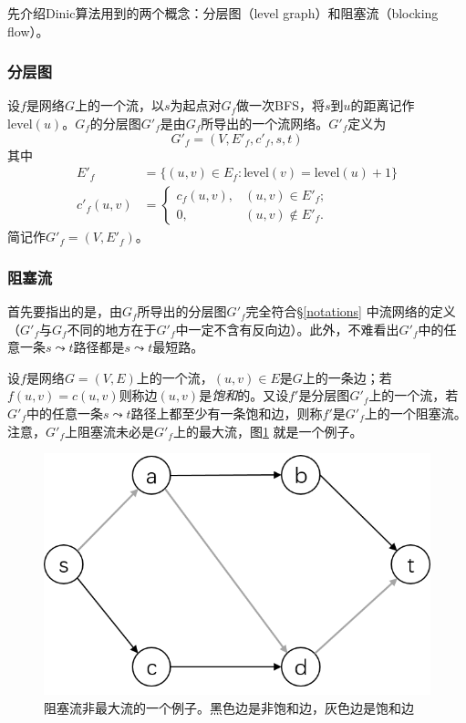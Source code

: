 \documentclass[a4paper]{ctexbook}
\begin{document}
  先介绍Dinic算法用到的两个概念：分层图（level graph）和阻塞流（blocking flow）。
  \subsubsection*{分层图}
  设$f$是网络$G$上的一个流，以$s$为起点对$G_f$做一次BFS，将$s$到$u$的距离记作$\mathrm{level}(u)$。$G_f$的分层图$G'_f$是由$G_f$所导出的一个流网络。$G'_f$定义为
  \[
  G'_f =(V, E'_f, c'_f, s, t)
  \]
  其中
  \begin{align*}
      E'_f &= \{(u,v)\in E_f\colon \mathrm{level}(v) = \mathrm{level}(u)+1\} \\
      c'_f(u,v) &=\begin{cases}
      c_f(u,v), & (u,v)\in E'_f;\\
      0, & (u,v)\notin E'_f.\end{cases}
  \end{align*}
  简记作$G'_f =(V, E'_f)$。
  \subsubsection{阻塞流}
  首先要指出的是，由$G_f$所导出的分层图$G'_f$完全符合\S\ref{notations} 中流网络的定义（$G'_f$与$G_f$不同的地方在于$G'_f$中一定不含有反向边）。此外，不难看出$G'_f$中的任意一条$s\leadsto t$路径都是$s\leadsto t$最短路。

  设$f$是网络$G=(V,E)$上的一个流，$(u,v)\in E$是$G$上的一条边；若$f(u,v) = c(u,v)$则称边$(u,v)$是\emph{饱和}的。又设$f'$是分层图$G'_f$上的一个流，若$G'_f$中的任意一条$s\leadsto t$路径上都至少有一条饱和边，则称$f'$是$G'_f$上的一个阻塞流。注意，$G'_f$上阻塞流未必是$G'_f$上的最大流，图\ref{Fig:blocking-flow} 就是一个例子。
  \begin{figure}
      \centering
      \includegraphics[scale=0.5]{figures/blocking-flow.png}
      \caption{阻塞流非最大流的一个例子。黑色边是非饱和边，灰色边是饱和边}
      \label{Fig:blocking-flow}
  \end{figure}
\end{document}
